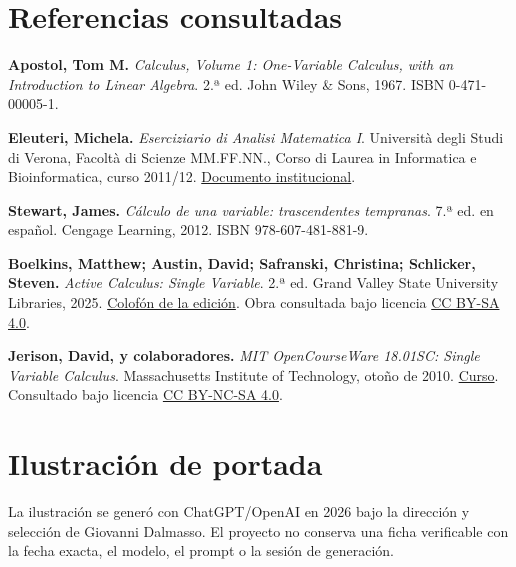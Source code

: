\documentclass[10pt,a4paper,oneside,openany]{book}
\begin{document}
\section*{Referencias consultadas}
\textbf{Apostol, Tom M.} \emph{Calculus, Volume 1: One-Variable Calculus, with an Introduction to Linear Algebra}. 2.ª ed. John Wiley \& Sons, 1967. ISBN 0-471-00005-1.

\textbf{Eleuteri, Michela.} \emph{Eserciziario di Analisi Matematica I}. Università degli Studi di Verona, Facoltà di Scienze MM.FF.NN., Corso di Laurea in Informatica e Bioinformatica, curso 2011/12. \href{https://www.di.univr.it/documenti/OccorrenzaIns/matdid/matdid259140.pdf}{Documento institucional}.

\textbf{Stewart, James.} \emph{Cálculo de una variable: trascendentes tempranas}. 7.ª ed. en español. Cengage Learning, 2012. ISBN 978-607-481-881-9.

\textbf{Boelkins, Matthew; Austin, David; Safranski, Christina; Schlicker, Steven.} \emph{Active Calculus: Single Variable}. 2.ª ed. Grand Valley State University Libraries, 2025. \href{https://activecalculus.org/single/frontmatter-3.html}{Colofón de la edición}. Obra consultada bajo licencia \href{https://creativecommons.org/licenses/by-sa/4.0/}{CC BY-SA 4.0}.

\textbf{Jerison, David, y colaboradores.} \emph{MIT OpenCourseWare 18.01SC: Single Variable Calculus}. Massachusetts Institute of Technology, otoño de 2010. \href{https://ocw.mit.edu/courses/18-01sc-single-variable-calculus-fall-2010/}{Curso}. Consultado bajo licencia \href{https://creativecommons.org/licenses/by-nc-sa/4.0/}{CC BY-NC-SA 4.0}.

\section*{Ilustración de portada}
La ilustración se generó con ChatGPT/OpenAI en 2026 bajo la dirección y selección de Giovanni Dalmasso. El proyecto no conserva una ficha verificable con la fecha exacta, el modelo, el prompt o la sesión de generación.

\PublicAuthorSection
\end{document}
